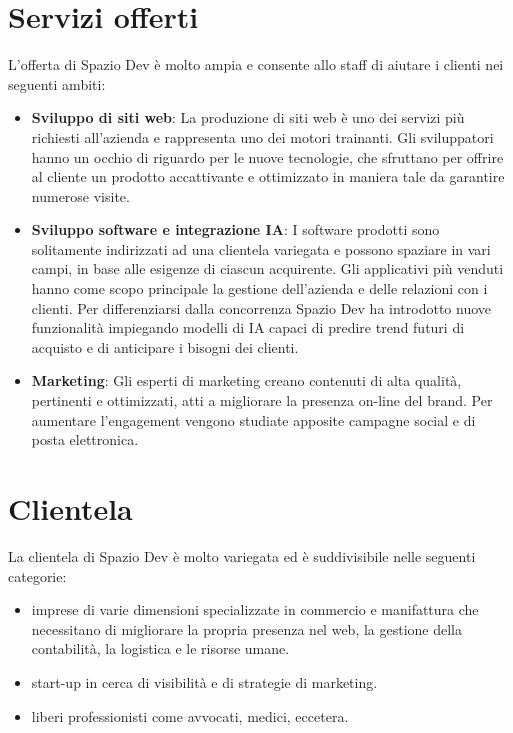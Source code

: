 \section{Servizi offerti}
L'offerta di Spazio Dev è molto ampia e consente allo staff di aiutare i clienti nei seguenti ambiti:
\begin{itemize}
  \item \textbf{Sviluppo di siti web}: La produzione di siti web è uno dei servizi più richiesti all'azienda e rappresenta uno dei motori trainanti. Gli sviluppatori hanno un occhio di riguardo per le nuove tecnologie, che sfruttano per offrire al cliente un prodotto accattivante e ottimizzato in maniera tale da garantire numerose visite.
  \item \textbf{Sviluppo software e integrazione IA}: I software prodotti sono solitamente indirizzati ad una clientela variegata e possono spaziare in vari campi, in base alle esigenze di ciascun acquirente. Gli applicativi più venduti hanno come scopo principale la gestione dell'azienda e delle relazioni con i clienti. Per differenziarsi dalla concorrenza Spazio Dev ha introdotto nuove funzionalità impiegando modelli di IA capaci di predire trend futuri di acquisto e  di anticipare i bisogni dei clienti.
  \item \textbf{Marketing}: Gli esperti di marketing creano contenuti di alta qualità, pertinenti e ottimizzati, atti a migliorare la presenza on-line del brand. Per aumentare l'engagement vengono studiate apposite campagne social e di posta elettronica.
\end{itemize}

\section{Clientela}
La clientela di Spazio Dev è molto variegata ed è suddivisibile nelle seguenti categorie:
\begin{itemize}
  \item imprese di varie dimensioni specializzate in commercio e manifattura che necessitano di migliorare la propria presenza nel web, la gestione della contabilità, la logistica e le risorse umane.
  \item start-up in cerca di visibilità e di strategie di marketing.
  \item liberi professionisti come avvocati, medici, eccetera.
\end{itemize}


